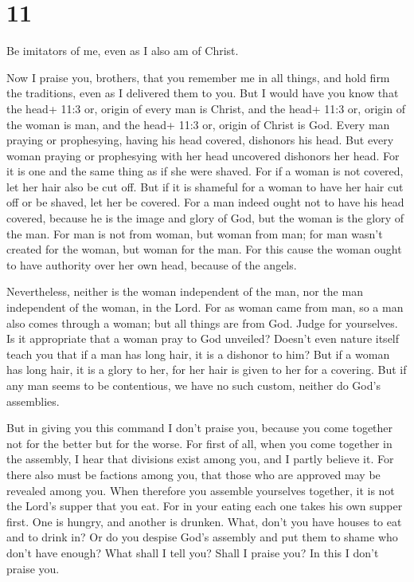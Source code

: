 \hypertarget{section-10}{%
\section{11}\label{section-10}}

 Be imitators of me, even as I also am of Christ.

 Now I praise you, brothers, that you remember me in all
things, and hold firm the traditions, even as I delivered them to you.
 But I would have you know that the head+ 11:3 or, origin of
every man is Christ, and the head+ 11:3 or, origin of the woman is man,
and the head+ 11:3 or, origin of Christ is God.  Every man
praying or prophesying, having his head covered, dishonors his head.
 But every woman praying or prophesying with her head
uncovered dishonors her head. For it is one and the same thing as if she
were shaved.  For if a woman is not covered, let her hair
also be cut off. But if it is shameful for a woman to have her hair cut
off or be shaved, let her be covered.  For a man indeed
ought not to have his head covered, because he is the image and glory of
God, but the woman is the glory of the man.  For man is not
from woman, but woman from man;  for man wasn't created for
the woman, but woman for the man.  For this cause the woman
ought to have authority over her own head, because of the angels.

 Nevertheless, neither is the woman independent of the man,
nor the man independent of the woman, in the Lord.  For as
woman came from man, so a man also comes through a woman; but all things
are from God.  Judge for yourselves. Is it appropriate that
a woman pray to God unveiled?  Doesn't even nature itself
teach you that if a man has long hair, it is a dishonor to him?
 But if a woman has long hair, it is a glory to her, for
her hair is given to her for a covering.  But if any man
seems to be contentious, we have no such custom, neither do God's
assemblies.

 But in giving you this command I don't praise you, because
you come together not for the better but for the worse. 
For first of all, when you come together in the assembly, I hear that
divisions exist among you, and I partly believe it.  For
there also must be factions among you, that those who are approved may
be revealed among you.  When therefore you assemble
yourselves together, it is not the Lord's supper that you eat.
 For in your eating each one takes his own supper first.
One is hungry, and another is drunken.  What, don't you
have houses to eat and to drink in? Or do you despise God's assembly and
put them to shame who don't have enough? What shall I tell you? Shall I
praise you? In this I don't praise you.

